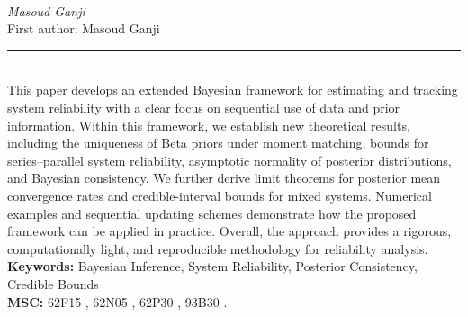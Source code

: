 \documentclass[10pt,twoside]{article}
\begin{document}
\noindent\begin{minipage}[t][\textheight]{\textwidth}
\\[0.35em]
{\itshape Masoud Ganji}\\[0.2em]
{\footnotesize First author: Masoud Ganji}\\[0.45em]
\noindent\rule{\textwidth}{0.3pt}\\[0.4em]
{\footnotesize  This paper develops an extended Bayesian framework for estimating and tracking system reliability with a clear focus on sequential use of data and prior information. Within this framework, we establish new theoretical results, including the uniqueness of Beta priors under moment matching, bounds for series--parallel system reliability, asymptotic normality of posterior distributions, and Bayesian consistency. We further derive limit theorems for posterior mean convergence rates and credible-interval bounds for mixed systems. Numerical examples and sequential updating schemes demonstrate how the proposed framework can be applied in practice. Overall, the approach provides a rigorous, computationally light, and reproducible methodology for reliability analysis.}\\[0.4em]
{\footnotesize\bfseries Keywords:} {\footnotesize Bayesian Inference, System Reliability, Posterior Consistency, Credible Bounds}\\[0.15em]
{\footnotesize\bfseries MSC:} {\footnotesize 62F15 , 62N05 , 62P30 , 93B30 .}\\
\vfill
\end{minipage}
\newpage
\end{document}

